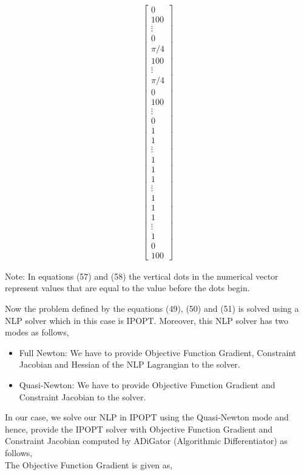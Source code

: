 \documentclass[11pt,usenames]{article}
\begin{document}
\begin{align}
\begin{bmatrix}
	0 \\ 100 \\ \vdots \\  0 \\ 
	\pi /4 \\ 100 \\ \vdots \\  \pi /4 \\ 
	0 \\ 100 \\ \vdots \\  0 \\ 
	1 \\ 1 \\ \vdots \\  1 \\ 
	1 \\ 1 \\ \vdots \\  1 \\ 
	1 \\ 1 \\ \vdots \\  1 \\  
	0 \\ 
	100  
	\end{bmatrix}
	\end{align}
	
	Note: In equations (57) and (58) the vertical dots in the numerical vector represent values that are equal to the value before the dots begin.
	
	Now the problem defined by the equations (49), (50) and (51) is solved using a NLP solver which in this case is IPOPT. Moreover, this NLP solver has two modes as follows, 
	
	\begin{itemize}
		\item Full Newton: We have to provide Objective Function Gradient, Constraint Jacobian and Hessian of the NLP Lagrangian to the solver.
		\item Quasi-Newton: We have to provide Objective Function Gradient and Constraint Jacobian to the solver.
	\end{itemize}
	
	In our case, we solve our NLP in IPOPT using the Quasi-Newton mode and hence, provide the IPOPT solver with Objective Function Gradient and Constraint Jacobian computed by ADiGator (Algorithmic Differentiator) as follows, \\
	
	The Objective Function Gradient is given as,
	
\end{document}
